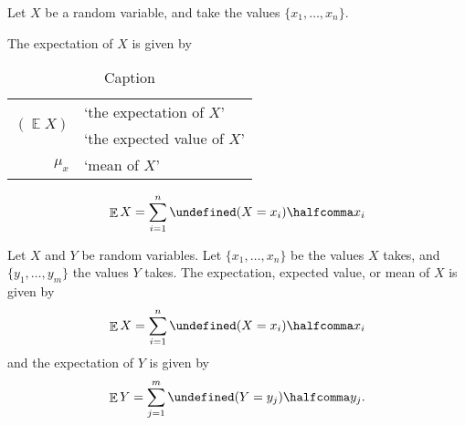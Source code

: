 \documentclass{article}
\let\P\undefined
\DeclareMathOperator\E{\mathbb{E}}
\DeclareMathOperator\P{\mathbb{P}}
\begin{document}
Let \(X\) be a random variable, and take the values \(\{x_{1}, \dotsc, x_{n}\}\).

The expectation of \(X\) is given by
\begin{table}[]
    \centering
\begin{tabular}{rl}
    \multirow{2}{20pt}{\((\E X)\)} & `the expectation of \(X\)'\\
        & `the expected value of \(X\)'\\ 
    \(\mu_x\) & `mean of \(X\)'\\
\end{tabular}
\caption{Caption}
    \label{tab:my_label}
\end{table}


\begin{equation*}
\E X = \sum_{i = 1}^{n} \P(X = x_{i}) \halfcomma x_{i}
\end{equation*}



Let \(X\) and \(Y\) be random variables.
Let \(\{x_{1}, \dotsc, x_{n}\}\) be the values \(X\) takes, and \(\{y_{1}, \dotsc, y_{m}\}\) the values \(Y\) takes.
The expectation, expected value, or mean of \(X\) is given by
\begin{equation*}
\E X = \sum_{i = 1}^{n} \P(X = x_{i}) \halfcomma x_{i}
\end{equation*}
and the expectation of \(Y\) is given by
\begin{equation*}
\E Y = \sum_{j = 1}^{m} \P(Y = y_{j}) \halfcomma y_{j}
.
\end{equation*}
\end{document}

